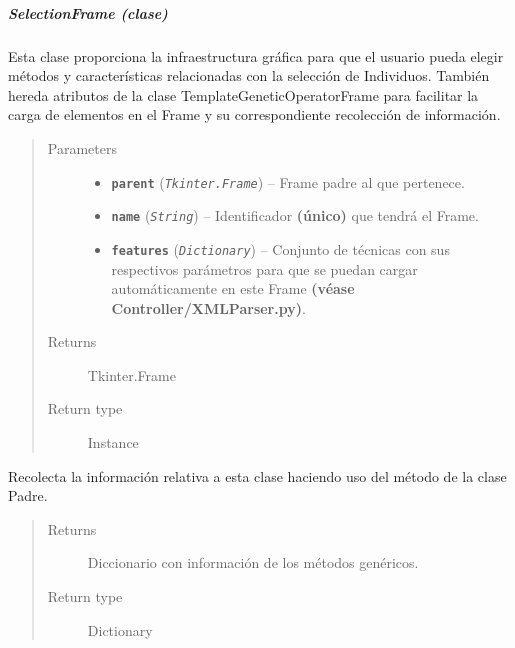 \documentclass[class=report, crop=false]{standalone}
\begin{document}
\subparagraph{SelectionFrame (clase)}
\label{sec:a_3_2_5_2_1}
\begin{fulllineitems}

\begin{DUlineblock}{0em}
\item[] Esta clase proporciona la infraestructura gráfica para que 
el usuario pueda elegir métodos y características relacionadas con 
la selección de Individuos.\break
También hereda atributos de la clase TemplateGeneticOperatorFrame 
para facilitar la carga de elementos en el Frame y su correspondiente 
recolección de información.
\end{DUlineblock}

\begin{quote}\begin{description}
\item[{Parameters}] \leavevmode\begin{itemize}
\item \textbf{\texttt{parent}} (\emph{\texttt{Tkinter.Frame}}) -- Frame padre al que pertenece.
\item \textbf{\texttt{name}} (\emph{\texttt{String}}) -- Identificador \textbf{(único)} que tendrá el Frame.
\item \textbf{\texttt{features}} (\emph{\texttt{Dictionary}}) -- Conjunto de técnicas con sus respectivos parámetros para que se puedan cargar automáticamente en este Frame \textbf{(véase Controller/XMLParser.py)}.
\end{itemize}

\item[{Returns}] \leavevmode
Tkinter.Frame
\item[{Return type}] \leavevmode
Instance
\end{description}\end{quote}


\begin{fulllineitems}

Recolecta la información relativa a esta clase haciendo 
uso del método de la clase Padre.

\begin{quote}\begin{description}
\item[{Returns}] \leavevmode
Diccionario con información de los métodos genéricos.
\item[{Return type}] \leavevmode
Dictionary
\end{description}\end{quote}


\end{fulllineitems}
\end{fulllineitems}
\end{document}
